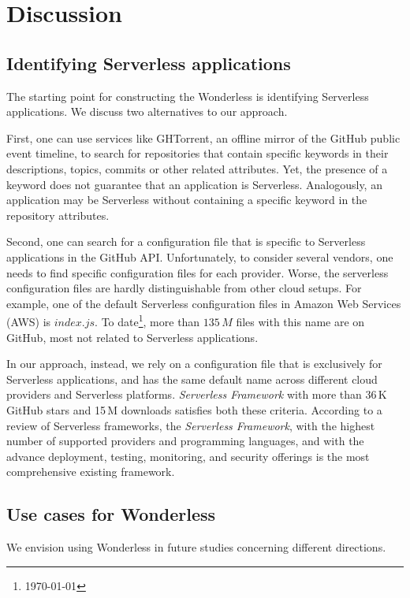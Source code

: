 
\section{Discussion}
\label{discussion}

\subsection{Identifying Serverless applications}
The starting point for constructing the Wonderless is identifying Serverless 
applications. We discuss two alternatives to our approach.

First, one can use services like GHTorrent\cite{gousios2012ghtorrent}, 
an offline mirror of the GitHub public event timeline, to search for repositories 
that contain specific keywords in their descriptions, topics, commits or other 
related attributes. Yet, the presence of a keyword does not guarantee 
that an application is Serverless. Analogously, an application may be Serverless 
without containing a specific keyword in the repository attributes.

Second, one can search for a configuration file that is 
specific to Serverless applications in the GitHub API. Unfortunately, to consider several vendors, 
one needs to find specific configuration files for each provider.
Worse, the serverless configuration files are hardly distinguishable from other cloud setups. 
For example, one of the default Serverless configuration files in Amazon 
Web Services\,(AWS) is $index.js$. To date\footnote{\today}, 
more than $135 \, M$ files with this name are on GitHub, most not 
related to Serverless applications. 

In our approach, instead, we rely on a configuration file that is exclusively 
for Serverless applications, and has the same default name across 
different cloud providers and Serverless platforms. 
\emph{Serverless Framework} with more than 36\,K GitHub stars and 15\,M 
downloads satisfies both these criteria. According to a review of Serverless 
frameworks\cite{kritikos2018review}, the \emph{Serverless Framework},
with the highest number of supported providers 
and programming languages, and with the advance 
deployment, testing, 
monitoring, and security offerings is the most comprehensive existing framework. 


\subsection{Use cases for Wonderless}
We envision using Wonderless in future studies 
concerning different directions.

